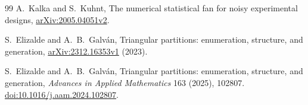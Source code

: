\documentclass[11pt,a4paper]{article}
\theoremstyle{remark}
\begin{document}
\begin{thebibliography}{99}
A.~Kalka and S.~Kuhnt,
The numerical statistical fan for noisy experimental designs,
\href{https://arxiv.org/abs/2005.04051v2}{arXiv:2005.04051v2}.

S.~Elizalde and A.~B.~Galv\'an,
Triangular partitions: enumeration, structure, and generation,
\href{https://arxiv.org/abs/2312.16353v1}{arXiv:2312.16353v1} (2023).

S.~Elizalde and A.~B.~Galv\'an,
Triangular partitions: enumeration, structure, and generation,
\emph{Advances in Applied Mathematics} 163 (2025), 102807.
\href{https://doi.org/10.1016/j.aam.2024.102807}{doi:10.1016/j.aam.2024.102807}.
\end{thebibliography}
\end{document}
